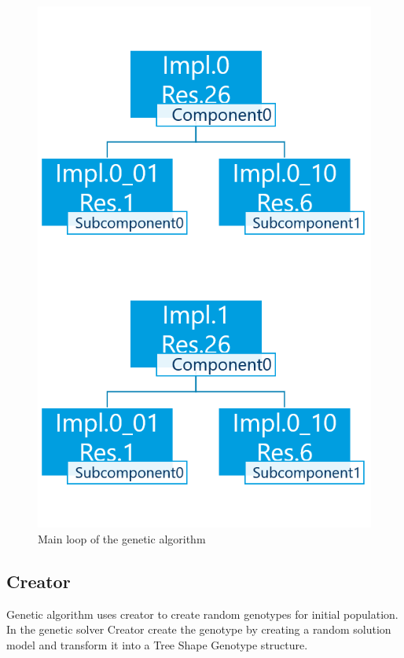 \begin{figure}
	\centering
	\includegraphics[width=\textwidth]{images/GeneticSolverMutation.png}
	\caption{Main loop of the genetic algorithm}
	\label{fig:GeneticSolverMutation}
\end{figure}

\subsection{Creator}
\label{subsec:Creator}
Genetic algorithm uses creator to create random genotypes for initial population.
In the genetic solver Creator create the genotype by creating a random solution model and transform it into a Tree Shape Genotype structure.

